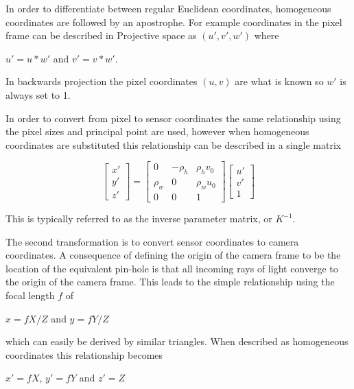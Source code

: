  In order to differentiate between regular Euclidean coordinates, homogeneous coordinates are followed by an apostrophe.  For example coordinates in the pixel frame can be described in Projective space as $(u',v',w')$ where 
 
 \begin{center}
 $u' = u*w'$ and $v'=v*w'$.
 \end{center}
 
 In backwards projection the pixel coordinates $(u,v)$ are what is known so $w'$ is always set to 1.  
 
 In order to convert from pixel to sensor coordinates the same relationship using the pixel sizes and principal point are used, however when homogeneous coordinates are substituted this relationship can be described in a single matrix
 
 \[
 \begin{bmatrix} x' \\ y' \\ z' \end{bmatrix}
 =
 \begin{bmatrix} 
     0   & -\rho_h & \rho_h v_0 \\ 
  \rho_w &    0    & \rho_w u_0 \\
     0   &    0    &      1  
 \end{bmatrix}
 \begin{bmatrix} u' \\ v' \\ 1 \end{bmatrix}
 \]
 
 This is typically referred to as the inverse parameter matrix, or $K^{-1}$.
 
 The second transformation is to convert sensor coordinates to camera coordinates.  A consequence of defining the origin of the camera frame to be the location of the equivalent pin-hole is that all incoming rays of light converge to the origin of the camera frame.  This leads to the simple relationship using the focal length $f$ of
  
  \begin{center}
  $x=fX/Z$  and $y=fY/Z$
  \end{center}
 
  which can easily be derived by similar triangles.  When described as homogeneous coordinates this relationship becomes 
  
  \begin{center}
  $x'=fX$, $y'=fY$ and $z'=Z$
  \end{center}
  
